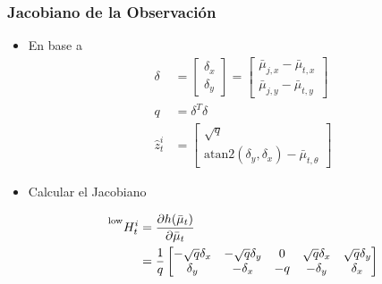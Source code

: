 \begin{frame}
    \frametitle{Jacobiano de la Observación}

    \begin{itemize}
        \item En base a
        \begin{align*}
            \delta &= 
            \begin{bmatrix}
                \delta_x \\
                \delta_y
            \end{bmatrix}
            = \begin{bmatrix}
                \bar{\mu}_{j,x} - \bar{\mu}_{t,x} \\
                \bar{\mu}_{j,y} - \bar{\mu}_{t,y}
            \end{bmatrix}\\
            q &= \delta^T \delta\\
            \hat{z}^i_t &= 
            \begin{bmatrix}
                \sqrt{q} \\
                \text{atan2}(\delta_y, \delta_x) - \bar{\mu}_{t,\theta}
            \end{bmatrix}
        \end{align*}

        \item Calcular el Jacobiano
        
        \begin{align*}
            \prescript{\text{low}}{}{H^{i}_{t}} &= \frac{\partial h(\bar{\mu}_t)}{\partial \bar{\mu}_t}\\
            &= \frac{1}{q}
            \begin{bmatrix}
                -\sqrt{q} \delta_x & -\sqrt{q} \delta_y & 0 & \sqrt{q} \delta_x & \sqrt{q} \delta_y\\
                \delta_y & -\delta_x & -q & -\delta_y & \delta_x
            \end{bmatrix}
        \end{align*}
    \end{itemize}

\end{frame}


